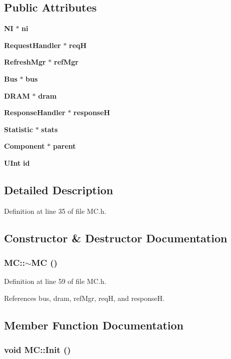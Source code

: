 \subsection*{Public Attributes}
\begin{CompactItemize}
\item 
{\bf NI} $\ast$ {\bf ni}
\item 
{\bf RequestHandler} $\ast$ {\bf reqH}
\item 
{\bf RefreshMgr} $\ast$ {\bf refMgr}
\item 
{\bf Bus} $\ast$ {\bf bus}
\item 
{\bf DRAM} $\ast$ {\bf dram}
\item 
{\bf ResponseHandler} $\ast$ {\bf responseH}
\item 
{\bf Statistic} $\ast$ {\bf stats}
\item 
{\bf Component} $\ast$ {\bf parent}
\item 
{\bf UInt} {\bf id}
\end{CompactItemize}


\subsection{Detailed Description}


Definition at line 35 of file MC.h.

\subsection{Constructor \& Destructor Documentation}
\subsubsection[{$\sim$MC}]{\setlength{\rightskip}{0pt plus 5cm}MC::$\sim$MC ()\hspace{0.3cm}{\tt  [inline]}}\label{classMC_c0e7c0a5f6f63dde3189b0349d425322}




Definition at line 59 of file MC.h.

References bus, dram, refMgr, reqH, and responseH.

\subsection{Member Function Documentation}
\subsubsection[{Init}]{\setlength{\rightskip}{0pt plus 5cm}void MC::Init ()}\label{classMC_05109b1e9678c5d598027d7c47d7b2a4}




